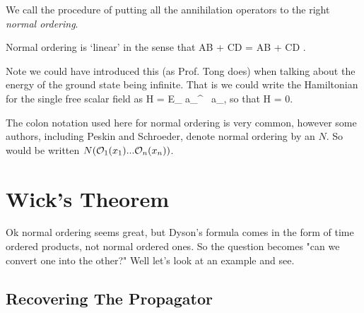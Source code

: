 We call the procedure of putting all the annihilation operators to the right \textit{normal ordering}. 


\br
    Normal ordering is `linear' in the sense that 
    \bse 
        \cl AB + CD \cl = \cl AB \cl + \cl CD \cl.
    \ese 
\er 

\br 
    Note we could have introduced this (as Prof. Tong does) when talking about the energy of the ground state being infinite. That is we could write the Hamiltonian for the single free scalar field as 
    \bse 
        \cl H \cl = \int {} E_{} a_{}^{\dagger} \, a_{},
    \ese 
    so that
    \bse 
        \cl H \cl {} = 0.
    \ese 
\er 

\bnn 
    The colon notation used here for normal ordering is very common, however some authors, including Peskin and Schroeder, denote normal ordering by an $N$. So  would be written $N(\mathcal{O}_1(x_1)...\mathcal{O}_n(x_n))$. 
\enn 

\section{Wick's Theorem}
\label{sec:WicksTheorm}

Ok normal ordering seems great, but Dyson's formula comes in the form of time ordered products, not normal ordered ones. So the question becomes "can we convert one into the other?" Well let's look at an example and see. 

\subsection{Recovering The Propagator}

